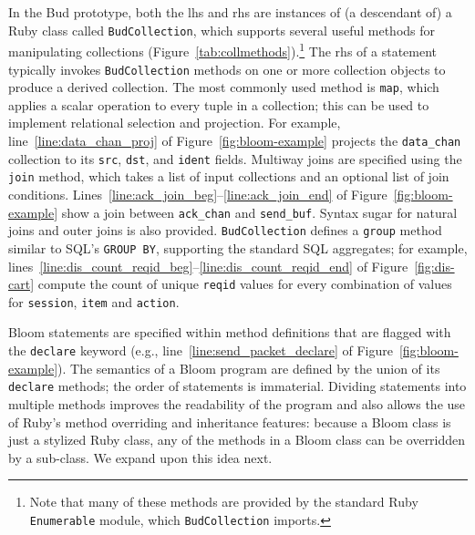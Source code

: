 In the Bud prototype, both the lhs and rhs are instances of (a descendant of) a
Ruby class called \texttt{BudCollection}, which supports several useful methods
for manipulating collections (Figure~\ref{tab:collmethods}).\footnote{Note that
  many of these methods are provided by the standard Ruby \texttt{Enumerable}
  module, which \texttt{BudCollection} imports.} The rhs of a statement
typically invokes \texttt{BudCollection} methods on one or more collection
objects to produce a derived collection. The most commonly used method is
\texttt{map}, which applies a scalar operation to every tuple in a collection;
this can be used to implement relational selection and projection. For example,
line~\ref{line:data_chan_proj} of Figure~\ref{fig:bloom-example} projects the
\texttt{data\_chan} collection to its \texttt{src}, \texttt{dst}, and
\texttt{ident} fields.  Multiway joins are specified using the \texttt{join}
method, which takes a list of input collections and an optional list of join
conditions.  Lines~\ref{line:ack_join_beg}--\ref{line:ack_join_end} of
Figure~\ref{fig:bloom-example} show a join between \texttt{ack\_chan} and
\texttt{send\_buf}. Syntax sugar for natural joins and outer joins is also
provided. \texttt{BudCollection} defines a \texttt{group} method similar to
SQL's \texttt{GROUP BY}, supporting the standard SQL aggregates; for example,
lines~\ref{line:dis_count_reqid_beg}--\ref{line:dis_count_reqid_end} of
Figure~\ref{fig:dis-cart} compute the count of unique \texttt{reqid} values for
every combination of values for \texttt{session}, \texttt{item} and
\texttt{action}.

Bloom statements are specified within method definitions that are flagged with
the \texttt{declare} keyword (e.g., line~\ref{line:send_packet_declare} of
Figure~\ref{fig:bloom-example}). The semantics of a Bloom program are defined by
the union of its \texttt{declare} methods; the order of statements is
immaterial. Dividing statements into multiple methods improves the readability
of the program and also allows the use of Ruby's method overriding and
inheritance features: because a Bloom class is just a stylized Ruby class, any
of the methods in a Bloom class can be overridden by a sub-class.  We expand upon this idea next.


